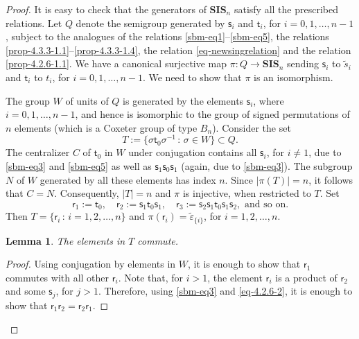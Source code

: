 \documentclass[a4paper]{amsart}
\newtheorem{lemma}[theorem]{Lemma}
\begin{document}
\begin{proof}
It is easy to check that the generators of ${\mathbf{SIS}}_n$ satisfy all
the prescribed relations. Let $Q$ denote the semigroup generated by 
$\mathsf{s}_i$ and $\mathsf{t}_i$, for $i=0,1,\dots,n-1$, subject to the 
analogues of the relations \eqref{sbm-eq1}--\eqref{sbm-eq5}, the relations 
\eqref{prop-4.3.3-1.1}--\eqref{prop-4.3.3-1.4},
the relation  \eqref{eq-newsingrelation}
and the relation \eqref{prop-4.2.6-1.1}. 
We have a canonical surjective map $\pi:Q\to \mathbf{SIS}_n$ sending 
$\mathsf{s}_i$ to $\tilde{s}_i$ and $\mathsf{t}_i$ to $t_i$, for $i=0,1,\dots,n-1$. 
We need to show that $\pi$ is an isomorphism.

The group $W$ of units of $Q$ is generated by the elements $\mathsf{s}_i$,
where $i=0,1,\dots,n-1$, and hence is isomorphic to the group 
of signed permutations of $n$ elements (which is a Coxeter group of
type $B_n$). Consider the set 
\begin{displaymath}
T:=\{\sigma\mathsf{t}_0\sigma^{-1}\,:\,\sigma\in W\}\subset Q.
\end{displaymath}
The centralizer $C$ of $\mathsf{t}_0$ in $W$ under conjugation 
contains all $\mathsf{s}_i$,
for $i\neq 1$, due to \eqref{sbm-eq3} and \eqref{sbm-eq5}
as well as $\mathsf{s}_1\mathsf{s}_0\mathsf{s}_1$ (again,
due to \eqref{sbm-eq3}). The subgroup $N$ of
$W$ generated by all these elements has index $n$. Since
$|\pi(T)|=n$, it follows that $C=N$. Consequently, $|T|=n$ and
$\pi$ is injective, when restricted to $T$. Set
\begin{equation}\label{eq-4.2.6-2}
\mathsf{r}_1:=\mathsf{t}_0,\quad
\mathsf{r}_2:=\mathsf{s}_1\mathsf{t}_0\mathsf{s}_1,\quad
\mathsf{r}_3:=\mathsf{s}_2\mathsf{s}_1\mathsf{t}_0\mathsf{s}_1\mathsf{s}_2,
\text{ and so on}.
\end{equation}
Then $T=\{\mathsf{r}_i\,:\,i=1,2,\dots,n\}$
and $\pi(\mathsf{r}_i)=\tilde{\varepsilon}_{\{i\}}$, for $i=1,2,\dots,n$.

\begin{lemma}\label{lem-4.2.6-3}
The elements in $T$ commute.
\end{lemma}

\begin{proof}
Using conjugation by elements in $W$, it is enough to show that 
$\mathsf{r}_1$ commutes with all other $\mathsf{r}_i$.
Note that, for $i>1$, the element  $\mathsf{r}_i$ is a product 
of $\mathsf{r}_2$ and some $\mathsf{s}_j$, for $j>1$. Therefore,
using \eqref{sbm-eq3} and \eqref{eq-4.2.6-2}, it is enough to show that
$\mathsf{r}_1\mathsf{r}_2=\mathsf{r}_2\mathsf{r}_1$.


\end{proof}
\end{proof}
\end{document}
